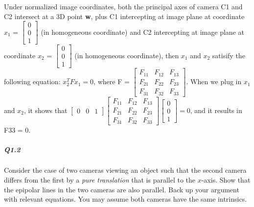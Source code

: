 \begin{your_solution}[title=Q1.1,height=6cm,width=\linewidth]
\scriptsize
Under normalized image coordinates, both the principal axes of camera C1 and C2 intersect at a 3D point {\bf w}, plus C1 intercepting at image plane at coordinate $x_1$ = $\begin{bmatrix} 0 \\ 0 \\ 1 \end{bmatrix}$ (in homogeneous coordinate) and C2 intercepting at image plane at coordinate $x_2$ = $\begin{bmatrix} 0 \\ 0 \\ 1 \end{bmatrix}$ (in homogeneous coordinate), then $x_1$ and $x_2$ satisify the following equation: $x_2^T F x_1 = 0$, where F = $\begin{bmatrix}
	F_{11} & F_{12} & F_{13} \\
	F_{21} & F_{22} & F_{23} \\
	F_{31} & F_{32} & F_{33}
\end{bmatrix}$.
When we plug in $x_1$ and $x_2$, it shows that $\begin{bmatrix} 0 & 0 & 1 \end{bmatrix}
\begin{bmatrix}
F_{11} & F_{12} & F_{13} \\
F_{21} & F_{22} & F_{23} \\
F_{31} & F_{32} & F_{33}
\end{bmatrix}
\begin{bmatrix} 0 \\ 0 \\ 1 \end{bmatrix} = 0$, and it results in F33 = 0.
\end{your_solution}

\subparagraph*{Q1.2}
Consider the case of two cameras viewing an object such that the second camera differs from the first by a \emph{pure translation} that is parallel to the $x$-axis. Show that the epipolar lines in the two cameras are also parallel. Back up your argument with relevant equations. You may assume both cameras have the same intrinsics.

